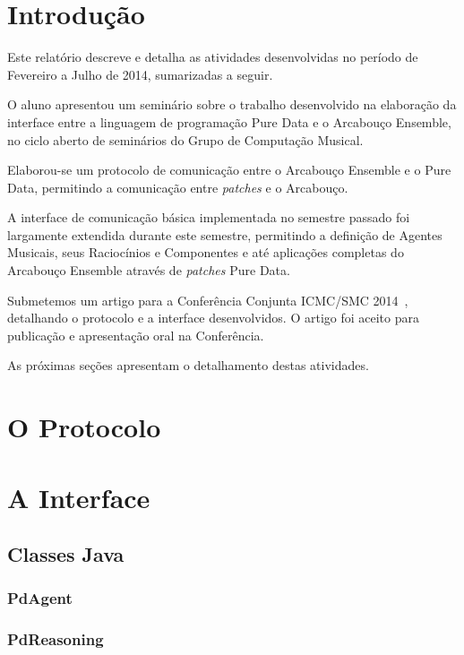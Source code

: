 \documentclass[a4paper, 11pt, twoside]{article}
\begin{document}
\begin{multicols}{2}

\section{Introdução}

Este relatório descreve e detalha as atividades desenvolvidas no período de 
Fevereiro a Julho de 2014, sumarizadas a seguir.

O aluno apresentou um seminário sobre o trabalho desenvolvido na elaboração da 
interface entre a linguagem de programação Pure Data e o Arcabouço Ensemble, 
no ciclo aberto de seminários do Grupo de Computação Musical.

Elaborou-se um protocolo de comunicação entre o Arcabouço Ensemble e o
Pure Data, permitindo a comunicação entre \textit{patches} e o Arcabouço.

A interface de comunicação básica implementada no semestre passado foi
largamente extendida durante este semestre, permitindo a definição de
Agentes Musicais, seus Raciocínios e Componentes e até aplicações
completas do Arcabouço Ensemble através de \textit{patches} Pure Data.

Submetemos um artigo para a Conferência Conjunta ICMC/SMC 2014~\cite{},
detalhando o protocolo e a interface desenvolvidos. O artigo foi aceito
para publicação e apresentação oral na Conferência.

As próximas seções apresentam o detalhamento destas atividades.

\section{O Protocolo}

\section{A Interface}

\subsection{Classes Java}

\subsubsection{PdAgent}

\subsubsection{PdReasoning}


\end{multicols}
\end{document}

